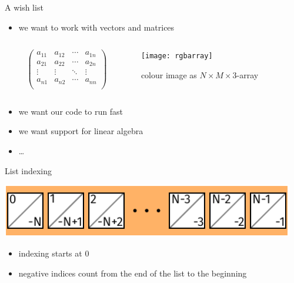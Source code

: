 \documentclass[svgnames]{beamer}
\begin{document}
\begin{frame}{A wish list}
 \begin{itemize}
  \item we want to work with vectors and matrices
 \end{itemize}

 \begin{columns}
  \begin{column}{0.55\textwidth}
   \begin{displaymath}
    \begin{pmatrix}
     a_{11} & a_{12} & \cdots & a_{1n}\\
     a_{21} & a_{22} & \cdots & a_{2n}\\
     \vdots & \vdots & \ddots & \vdots\\
     a_{n1} & a_{n2} & \cdots & a_{nn}\\
    \end{pmatrix}
   \end{displaymath}
  \end{column}%
  \begin{column}{0.45\textwidth}
   \qquad\texttt{[image: rgbarray]}

   colour image as $N\times M\times3$-array
  \end{column}
 \end{columns}

 \begin{itemize}
  \item we want our code to run fast
  \item we want support for linear algebra
  \item \dots 
 \end{itemize}
\end{frame}

\begin{frame}{List indexing}
 \begin{center}
  \includegraphics[width=0.96\textwidth]{listindexing2}
 \end{center}
 \begin{itemize}
  \item indexing starts at 0
  \item negative indices count from the end of the list to the beginning
 \end{itemize}
\end{frame}
\end{document}
